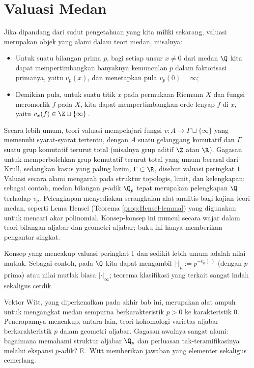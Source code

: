 
\chapter{Valuasi Medan}
Jika dipandang dari sudut pengetahuan yang kita miliki sekarang, valuasi merupakan objek yang alami dalam teori medan, misalnya:
\begin{itemize}
	\item Untuk suatu bilangan prima $p$, bagi setiap unsur $x \neq 0$ dari medan $\Q$ kita dapat mempertimbangkan banyaknya kemunculan $p$ dalam faktorisasi primanya, yaitu $v_p(x)$, dan menetapkan pula $v_p(0)=\infty$;
	\item Demikian pula, untuk suatu titik $x$ pada permukaan Riemann $X$ dan fungsi meromorfik $f$ pada $X$, kita dapat mempertimbangkan orde lenyap $f$ di $x$, yaitu $v_x(f) \in \Z \sqcup \{\infty\}$.
\end{itemize}
Secara lebih umum, teori valuasi mempelajari fungsi $v: A \to \Gamma \sqcup \{\infty\}$ yang memenuhi syarat-syarat tertentu, dengan $A$ suatu gelanggang komutatif dan $\Gamma$ suatu grup komutatif terurut total (misalnya grup aditif $\Z$ atau $\R$). Gagasan untuk memperbolehkan grup komutatif terurut total yang umum berasal dari Krull, sedangkan kasus yang paling lazim, $\Gamma \subset \R$, disebut valuasi peringkat $1$. Valuasi secara alami mengarah pada struktur topologis, limit, dan kelengkapan; sebagai contoh, medan bilangan $p$-adik $\Q_p$ tepat merupakan pelengkapan $\Q$ terhadap $v_p$. Pelengkapan menyediakan serangkaian alat analitis bagi kajian teori medan, seperti Lema Hensel (Teorema \ref{prop:Hensel-lemma}) yang digunakan untuk mencari akar polinomial. Konsep-konsep ini muncul secara wajar dalam teori bilangan aljabar dan geometri aljabar; buku ini hanya memberikan pengantar singkat.

Konsep yang mencakup valuasi peringkat $1$ dan sedikit lebih umum adalah nilai mutlak. Sebagai contoh, pada $\Q$ kita dapat mengambil $|\cdot|_p := p^{-v_p(\cdot)}$ (dengan $p$ prima) atau nilai mutlak biasa $|\cdot|_\infty$; teorema klasifikasi yang terkait sangat indah sekaligus cerdik.

Vektor Witt, yang diperkenalkan pada akhir bab ini, merupakan alat ampuh untuk mengangkat medan sempurna berkarakteristik $p > 0$ ke karakteristik $0$. Penerapannya mencakup, antara lain, teori kohomologi varietas aljabar berkarakteristik $p$ dalam geometri aljabar. Gagasan awalnya sangat alami: bagaimana memahami struktur aljabar $\Q_p$ dan perluasan tak-teramifikasinya melalui ekspansi $p$-adik? E.\ Witt memberikan jawaban yang elementer sekaligus cemerlang.

